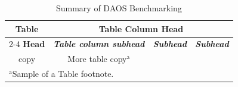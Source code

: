 \begin{table}[htbp]
\caption{Summary of DAOS Benchmarking}
\label{tab:perf-lit-review}
\begin{center}
\begin{tabular}{|c|c|c|c|}
\hline
\textbf{Table}&\multicolumn{3}{|c|}{\textbf{Table Column Head}} \\
\cline{2-4} 
\textbf{Head} & \textbf{\textit{Table column subhead}}& \textbf{\textit{Subhead}}& \textbf{\textit{Subhead}} \\
\hline
copy& More table copy$^{\mathrm{a}}$& &  \\
\hline
\multicolumn{4}{l}{$^{\mathrm{a}}$Sample of a Table footnote.}
\end{tabular}
\end{center}
\end{table}